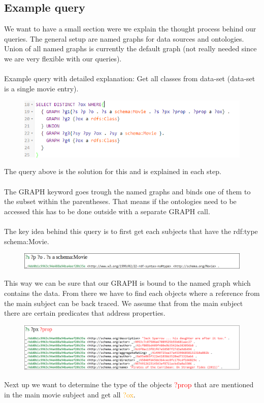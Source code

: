 \documentclass{article}
\begin{document}
\subsection{Example query}
We want to have a small section were we explain the thought process behind our queries. The general setup are named graphs for data sources and ontologies. Union of all named graphs is currently the default graph (not really needed since we are very flexible with our queries). \\ \\
Example query with detailed explanation: Get all classes from data-set (data-set is a single movie entry).

\begin{figure}[H]
  \centering
  \includegraphics[width=12cm]{pictures/example_query.png}
  \label{fig:exqu}
\end{figure}
\noindent
The query above is the solution for this and is explained in each step. \\ \\
The GRAPH keyword goes trough the named graphs and binds one of them to the subset within the parentheses. That means if the ontologies need to be accessed this has to be done outside with a separate GRAPH call.\\ \\
The key idea behind this query is to first get each subjects that have the rdf:type schema:Movie.

\begin{figure}[H]
  \centering
  \includegraphics[width=12cm]{pictures/example_query2.png}
  \label{fig:exqu2}
\end{figure}
\noindent
This way we can be sure that our GRAPH is bound to the named graph which contains the data. From there we have to find each objects where a reference from the main subject can be back traced. We assume that from the main subject there are certain predicates that address properties.

\begin{figure}[H]
  \centering
  \includegraphics[width=12cm]{pictures/example_query3.png}
  \label{fig:exqu3}
\end{figure}
\noindent
Next up we want to determine the type of the objects \textcolor{red}{?prop} that are mentioned in the main movie subject and get all \textcolor{orange}{?ox}.
\end{document}
